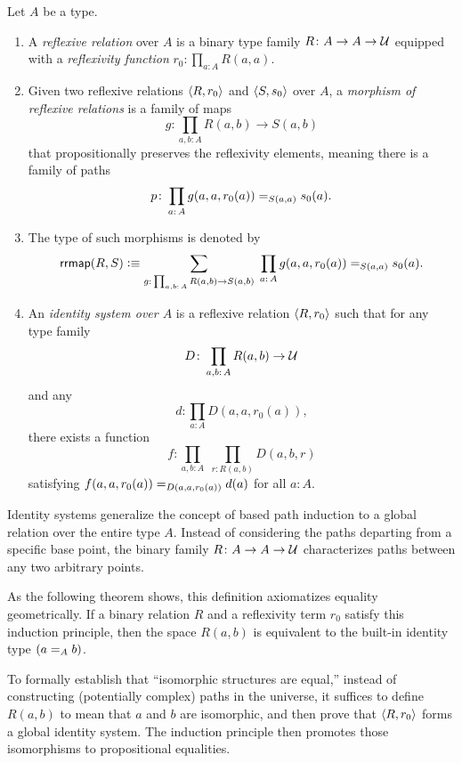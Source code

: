 \begin{defns}
    Let $A$ be a type.
    \begin{enumerate}[-]
        \item A \textsl{reflexive relation} over $A$ is a binary type family $R\colon A\to A\to\univ$ equipped with a \textsl{reflexivity function} $r_0\colon\prod_{a\colon A}R(a,a)$.
        
        \item Given two reflexive relations $\langle R,r_0\rangle$ and $\langle S,s_0\rangle$ over $A$, a \textsl{morphism of reflexive relations} is a family of maps
        \[
            g\colon\prod_{a,b\colon A}R(a,b)\to S(a,b)
        \]
        that propositionally preserves the reflexivity elements, meaning there is a family of paths 
        \[
            p\colon\prod_{a\colon A}
                g(a,a,r_0(a))\eq{S(a,a)}s_0(a).
        \]
        
        \item The type of such morphisms is denoted by
        \[
            \fun{rrmap}(R,S)\defeq
            \sum_{g\colon\prod_{a,b\colon A}R(a,b)\to S(a,b)}\;
                \prod_{a\colon A}g(a,a,r_0(a))\eq{S(a,a)}s_0(a).
        \]
        
        \item An \textsl{identity system over $A$} is a reflexive relation $\langle R,r_0\rangle$
        such that for any type family 
        \[
            D\colon\prod_{a,b\colon A}R(a,b)\to\univ
        \]
        and any
        \[
            d\colon\prod_{a\colon A}D(a,a,r_0(a)),
        \]
        there exists a function
        \[
            f\colon
                \prod_{a,b\colon A}\;
                \prod_{r\colon R(a,b)}
                    D(a,b,r)
        \]
        satisfying $f(a,a,r_0(a))\mathrel{=_{D(a,a,r_0(a))}}d(a)$ for all $a\colon A$.
    \end{enumerate}
\end{defns}

\begin{rem}
    Identity systems generalize the concept of based path induction to a global relation over the entire type $A$. Instead of considering the paths departing from a specific base point, the binary family $R\colon A\to A\to\univ$ characterizes paths between any two arbitrary points.
    
    As the following theorem shows, this definition axiomatizes equality geometrically. If a binary relation $R$ and a reflexivity term $r_0$ satisfy this induction principle, then the space $R(a,b)$ is equivalent to the built-in identity type $(a\mathrel{=_{A}}b)$. 
    
    To formally establish that ``isomorphic structures are equal,'' instead of constructing (potentially complex) paths in the universe, it suffices to define $R(a,b)$ to mean that $a$ and $b$ are isomorphic, and then prove that $\langle R,r_0\rangle$ forms a global identity system. The induction principle then promotes those isomorphisms to propositional equalities.
\end{rem}

